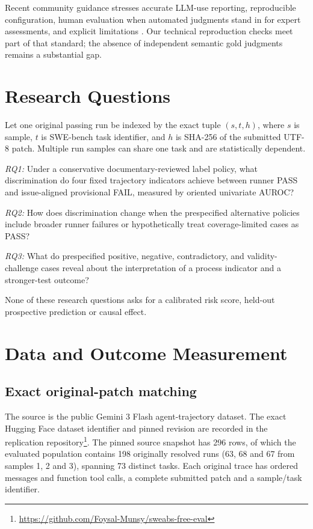 \documentclass[journal]{IEEEtran}
\begin{document}
Recent community guidance stresses accurate LLM-use reporting, reproducible configuration, human evaluation when automated judgments stand in for expert assessments, and explicit limitations \cite{baltes2026guidelines}. Our technical reproduction checks meet part of that standard; the absence of independent semantic gold judgments remains a substantial gap.

\section{Research Questions}
Let one original passing run be indexed by the exact tuple $(s,t,h)$, where $s$ is sample, $t$ is SWE-bench task identifier, and $h$ is SHA-256 of the submitted UTF-8 patch. Multiple run samples can share one task and are statistically dependent.

\emph{RQ1:} Under a conservative documentary-reviewed label policy, what discrimination do four fixed trajectory indicators achieve between runner PASS and issue-aligned provisional FAIL, measured by oriented univariate AUROC?

\emph{RQ2:} How does discrimination change when the prespecified alternative policies include broader runner failures or hypothetically treat coverage-limited cases as PASS?

\emph{RQ3:} What do prespecified positive, negative, contradictory, and validity-challenge cases reveal about the interpretation of a process indicator and a stronger-test outcome?

None of these research questions asks for a calibrated risk score, held-out prospective prediction or causal effect.

\section{Data and Outcome Measurement}
\subsection{Exact original-patch matching}
The source is the public Gemini 3 Flash agent-trajectory dataset. The exact Hugging Face dataset identifier and pinned revision are recorded in the replication repository\footnote{\url{https://github.com/Foysal-Munsy/sweabs-free-eval}}. The pinned source snapshot has 296 rows, of which the evaluated population contains 198 originally resolved runs (63, 68 and 67 from samples 1, 2 and 3), spanning 73 distinct tasks. Each original trace has ordered messages and function tool calls, a complete submitted patch and a sample/task identifier.
\end{document}
